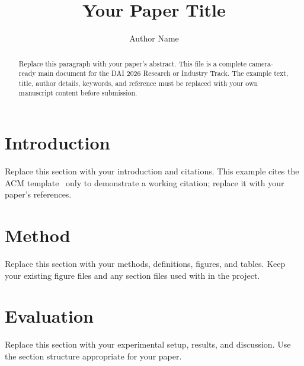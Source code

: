 \documentclass[sigconf]{acmart}
\begin{document}
\title{Your Paper Title}

\author{Author Name}

\begin{abstract}
Replace this paragraph with your paper's abstract. This file is a complete
camera-ready main document for the DAI 2026 Research or Industry Track. The example
text, title, author details, keywords, and reference must be replaced with
your own manuscript content before submission.
\end{abstract}


\maketitle

\section{Introduction}
Replace this section with your introduction and citations. This example
cites the ACM template~\cite{acm-template} only to demonstrate a working
citation; replace it with your paper's references.

\section{Method}
Replace this section with your methods, definitions, figures, and tables.
Keep your existing figure files and any section files used with
\texttt{\string} in the project.

\section{Evaluation}
Replace this section with your experimental setup, results, and discussion.
Use the section structure appropriate for your paper.
\end{document}

